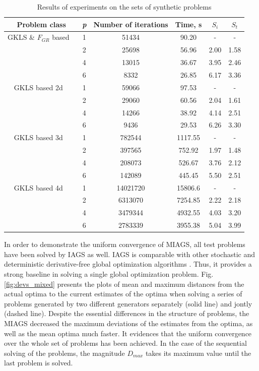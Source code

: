\documentclass[runningheads]{llncs}
\begin{document}
\begin{table}
  \centering
  \caption{Results of experiments on the sets of synthetic problems}
  \label{tab:speedup}
  \begin{tabular}{c|c|cccc}
    Problem class & \textit{p} & Number of iterations & Time, s & \(S_i\) & \(S_t\)   \\
    \hline
    GKLS \& \(F_{GR}\) based \
      & 1 & 51434 & 90.20 & -    & - \\
      & 2 & 25698 & 56.96 & 2.00 & 1.58 \\
      & 4 & 13015 & 36.67 & 3.95 & 2.46 \\
      & 6 & 8332  & 26.85 & 6.17 & 3.36 \\
    \hline
    GKLS based 2d \
      & 1 & 59066 & 97.53 & -    & - \\
      & 2 & 29060 & 60.56 & 2.04 & 1.61 \\
      & 4 & 14266 & 38.92 & 4.14 & 2.51 \\
      & 6 & 9436  & 29.53 & 6.26 & 3.30 \\
    \hline
    GKLS based 3d \
      & 1 & 782544 & 1117.55 & -    & - \\
      & 2 & 397565 & 752.92  & 1.97 & 1.48 \\
      & 4 & 208073 & 526.67  & 3.76 & 2.12 \\
      & 6 & 142089 & 445.45  & 5.50 & 2.51 \\
    \hline
    GKLS based 4d \
      & 1 & 14021720 & 15806.6 & -    & - \\
      & 2 & 6313070 & 7254.85  & 2.22 & 2.18 \\
      & 4 & 3479344 & 4932.55  & 4.03 & 3.20 \\
      & 6 & 2783339 & 3955.38  & 5.04 & 3.99 \\
    \hline
  \end{tabular}
\end{table}

In order to demonstrate the uniform convergence of MIAGS, all test problems have been solved by IAGS as well.
IAGS is comparable with other stochastic and deterministic derivative-free global optimization algorithms \cite{Sovrasov2019}. Thus, it
provides a strong baseline in solving a single global optimization problem.
Fig. \ref{fig:devs_mixed} presents the plots of mean and maximum distances from the actual
optima to the current estimates of the optima when solving a series of problems generated by
two different generators separately (solid line) and jontly (dashed line).
Despite the essential differences in the structure of problems, the MIAGS decreased
the maximum deviations of the estimates from the optima, as well as the mean optima much faster.
It evidences that the uniform convergence over the whole set of problems has been achieved.
In the case of the sequential solving of the problems, the magnitude \(D_{max}\) takes
its maximum value until the last problem is solved.
\end{document}
